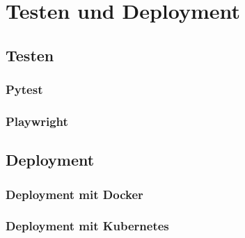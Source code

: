 
\section{Testen und Deployment}

\subsection{Testen}

\subsubsection{Pytest}

\subsubsection{Playwright}

\subsection{Deployment}

\subsubsection{Deployment mit Docker}

\subsubsection{Deployment mit Kubernetes}
